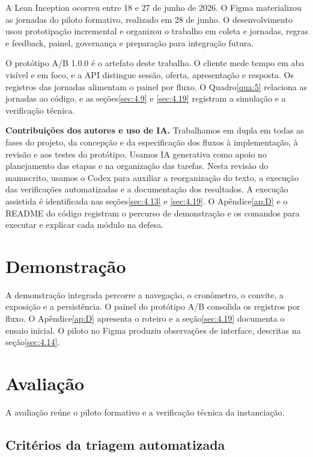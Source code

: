 A Lean Inception ocorreu entre 18 e 27 de junho de 2026. O Figma materializou as jornadas do piloto formativo, realizado em 28 de junho. O desenvolvimento usou prototipação incremental \cite{sommerville2011} e organizou o trabalho em coleta e jornadas, regras e feedback, painel, governança e preparação para integração futura.

O protótipo A/B 1.0.0 é o artefato deste trabalho. O cliente mede tempo em aba visível e em foco, e a API distingue sessão, oferta, apresentação e resposta. Os registros das jornadas alimentam o painel por fluxo. O Quadro\nobreakspace{}\ref{qua:5} relaciona as jornadas ao código, e as seções\nobreakspace{}\ref{sec:4.9} e \ref{sec:4.19} registram a simulação e a verificação técnica.

\textbf{Contribuições dos autores e uso de IA.} Trabalhamos em dupla em todas as fases do projeto, da concepção e da especificação dos fluxos à implementação, à revisão e aos testes do protótipo. Usamos IA generativa como apoio no planejamento das etapas e na organização das tarefas. Nesta revisão do manuscrito, usamos o Codex para auxiliar a reorganização do texto, a execução das verificações automatizadas e a documentação dos resultados. A execução assistida é identificada nas seções\nobreakspace{}\ref{sec:4.13} e \ref{sec:4.19}. O Apêndice\nobreakspace{}\ref{ap:D} e o README do código registram o percurso de demonstração e os comandos para executar e explicar cada módulo na defesa.

\section{Demonstração}
\label{sec:3.5}

A demonstração integrada percorre a navegação, o cronômetro, o convite, a exposição e a persistência. O painel do protótipo A/B consolida os registros por fluxo. O Apêndice\nobreakspace{}\ref{ap:D} apresenta o roteiro e a seção\nobreakspace{}\ref{sec:4.19} documenta o ensaio inicial. O piloto no Figma produziu observações de interface, descritas na seção\nobreakspace{}\ref{sec:4.14}.

\section{Avaliação}
\label{sec:3.6}

A avaliação reúne o piloto formativo e a verificação técnica da instanciação.

\subsection{Critérios da triagem automatizada}
\label{sec:3.6.1}

